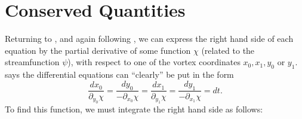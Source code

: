 \documentclass[10pt, a4paper]{article}
\numberwithin{equation}{section}
\begin{document}
\section{Conserved Quantities}
Returning to , and again following \citeauthor{love94}, we can express the right hand side of each equation by the partial derivative of some function $\chi$ (related to the streamfunction $\psi$), with respect to one of the vortex coordinates $x_0,x_1,y_0$ or $y_1$.
\citeauthor{love94} says the differential equations can ``clearly'' be put in the form
\begin{equation}
\frac{dx_0}{\partial_{y_0}\chi}=\frac{dy_0}{-\partial_{x_0}\chi}=\frac{dx_1}{\partial_{y_1}\chi}=\frac{dy_1}{-\partial_{x_1}\chi}=dt.
\label{eq:lovechi}
\end{equation}
To find this function, we must integrate the right hand side as follows:
\end{document}
